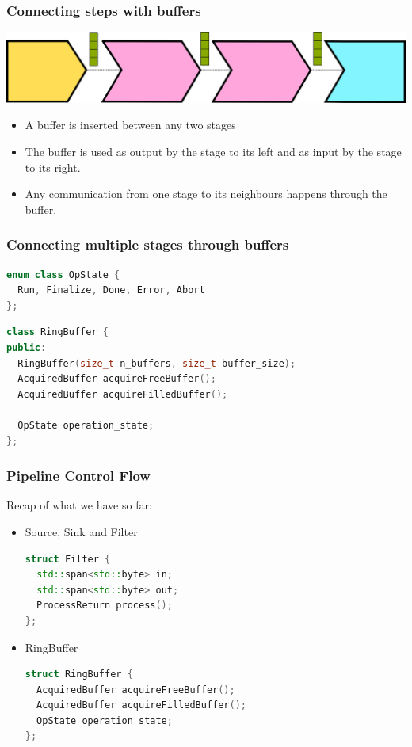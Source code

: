 \documentclass[aspectratio=169]{beamer}
\newif\iftransitions
\begin{document}
\begin{frame}
  \frametitle{Connecting steps with buffers}
  \begin{center}
    \includegraphics[width=.80\textwidth]{pipelinesgfx/pipe_with_buffers.png}
  \end{center}
  \begin{itemize}
  \item A buffer is inserted between any two stages
  \item The buffer is used as output by the stage to its left and as input by the stage to its right.
  \item Any communication from one stage to its neighbours happens through the buffer.
  \end{itemize}
\end{frame}

\begin{frame}[fragile]
  \frametitle{Connecting multiple stages through buffers}
  
  \begin{lstlisting}[language={C++}]
enum class OpState {
  Run, Finalize, Done, Error, Abort
};
  \end{lstlisting} \iftransitions \pause \fi
  
  \begin{lstlisting}[language={C++}]
class RingBuffer {
public:
  RingBuffer(size_t n_buffers, size_t buffer_size);
  AcquiredBuffer acquireFreeBuffer();
  AcquiredBuffer acquireFilledBuffer();
  
  OpState operation_state;
};
  \end{lstlisting}
\end{frame}

\begin{frame}[fragile]
  \frametitle{Pipeline Control Flow}
  
  Recap of what we have so far:
  \begin{itemize}
  \item Source, Sink and Filter
  \begin{lstlisting}[language={C++}]
struct Filter {
  std::span<std::byte> in;
  std::span<std::byte> out;
  ProcessReturn process();
};
  \end{lstlisting}     \iftransitions \pause \fi
  \item RingBuffer
  \begin{lstlisting}[language={C++}]
struct RingBuffer {
  AcquiredBuffer acquireFreeBuffer();
  AcquiredBuffer acquireFilledBuffer();
  OpState operation_state;
};
  \end{lstlisting}
  \end{itemize}
\end{frame}
\end{document}
